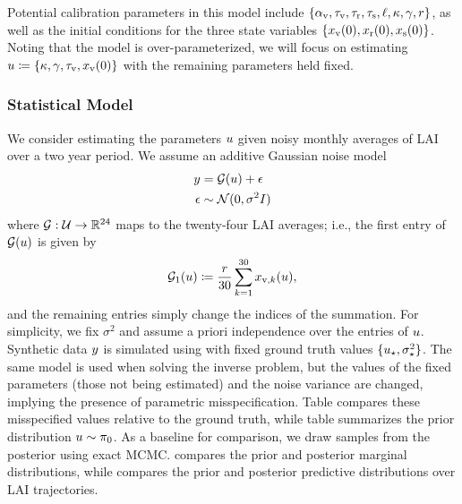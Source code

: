 \documentclass[12pt]{article}
\begin{document}
Potential calibration parameters in this model include 
$\{\alpha_{\textrm{v}}, \tau_{\textrm{v}}, \tau_{\textrm{r}}, \tau_{\textrm{s}}, \ell, \kappa, \gamma, r\}$, as well as the initial conditions for the three state
variables $\{x_{\textrm{v}}(0), x_{\textrm{r}}(0), x_{\textrm{s}}(0)\}$.
Noting that the model is over-parameterized, we will focus on estimating 
$u \coloneqq \{\kappa, \gamma, \tau_{\textrm{v}}, x_{\textrm{v}}(0)\}$ with the remaining parameters held fixed.

\subsubsection{Statistical Model}
We consider estimating the parameters $u$ given noisy monthly averages of LAI over a two year period.
We assume an additive Gaussian noise model
\begin{align}
y &= \mathcal{G}(u) + \epsilon \label{eq:vsem-inv-prob} \\
\epsilon &\sim \mathcal{N}(0, \sigma^2 I) \nonumber 
\end{align}
where $\mathcal{G}: \mathcal{U} \to \mathbb{R}^{24}$ maps to the twenty-four LAI averages; i.e., the first entry of $\mathcal{G}(u)$
is given by 
\begin{equation}
\mathcal{G}_{1}(u) \coloneqq \frac{r}{30} \sum_{k=1}^{30} x_{\textrm{v},k}(u),
\end{equation}
and the remaining entries simply change the indices of the summation. For simplicity, we fix $\sigma^2$
and assume a priori independence over the entries of $u$. Synthetic data $y$ is simulated
using  with fixed ground truth values $\{u_{\star}, \sigma^2_{\star}\}$. The same 
model is used when solving the inverse problem, but the values of the fixed parameters (those not
being estimated) and the noise variance are changed, implying the presence of parametric misspecification.
Table \todo compares these misspecified values relative to the ground truth, while
table \todo summarizes the prior distribution $u \sim \pi_0$. As a baseline for comparison, we 
draw samples from the posterior using exact MCMC.  compares the prior 
and posterior marginal distributions, while  compares the prior and 
posterior predictive distributions over LAI trajectories.
\end{document}
